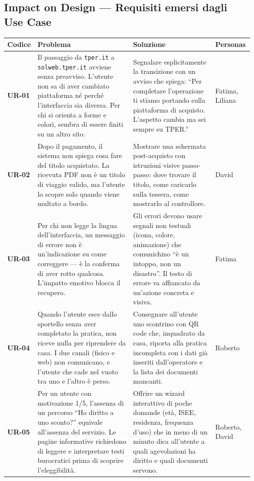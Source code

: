 ﻿\documentclass[11pt,a4paper]{article}
\begin{document}
\subsection{Impact on Design --- Requisiti emersi dagli Use Case}

\begin{tcolorbox}[base]
{\small
\renewcommand{\arraystretch}{1.3}
\begin{tabular}{|p{1.2cm}|p{5cm}|p{5cm}|p{2.8cm}|}
\hline
\textbf{Codice} & \textbf{Problema} & \textbf{Soluzione} & \textbf{Personas} \\
\hline
\textbf{UR-01} & Il passaggio da \texttt{tper.it} a
\texttt{solweb.tper.it} avviene senza preavviso. L'utente non sa di aver
cambiato piattaforma né perché l'interfaccia sia diversa. Per chi si
orienta a forme e colori, sembra di essere finiti su un altro sito. &
Segnalare esplicitamente la transizione con un avviso che spiega: ``Per
completare l'operazione ti stiamo portando sulla piattaforma di
acquisto. L'aspetto cambia ma sei sempre su TPER.'' & Fatima, Liliana \\
\hline
\textbf{UR-02} & Dopo il pagamento, il sistema non spiega cosa fare del
titolo acquistato. La ricevuta PDF non è un titolo di viaggio valido,
ma l'utente lo scopre solo quando viene multato a bordo. & Mostrare una
schermata post-acquisto con istruzioni visive passo-passo: dove trovare
il titolo, come caricarlo sulla tessera, come mostrarlo al controllore.
& David \\
\hline
\textbf{UR-03} & Per chi non legge la lingua dell'interfaccia, un
messaggio di errore non è un'indicazione su come correggere --- è la
conferma di aver rotto qualcosa. L'impatto emotivo blocca il recupero. &
Gli errori devono usare segnali non testuali (icona, colore,
animazione) che comunichino ``è un intoppo, non un disastro''. Il
testo di errore va affiancato da un'azione concreta e visiva. &
Fatima \\
\hline
\textbf{UR-04} & Quando l'utente esce dallo sportello senza aver
completato la pratica, non riceve nulla per riprendere da casa. I due
canali (fisico e web) non comunicano, e l'utente che cade nel vuoto tra
uno e l'altro è perso. & Consegnare all'utente uno scontrino con QR
code che, inquadrato da casa, riporta alla pratica incompleta con i
dati già inseriti dall'operatore e la lista dei documenti mancanti. &
Roberto \\
\hline
\textbf{UR-05} & Per un utente con motivazione 1/5, l'assenza di un
percorso ``Ho diritto a uno sconto?'' equivale all'assenza del
servizio. Le pagine informative richiedono di leggere e interpretare
testi burocratici prima di scoprire l'eleggibilità. & Offrire un
wizard interattivo di poche domande (età, ISEE, residenza, frequenza
d'uso) che in meno di un minuto dica all'utente a quali agevolazioni
ha diritto e quali documenti servono. & Roberto, David \\
\hline
\end{tabular}}
\end{tcolorbox}
\end{document}
